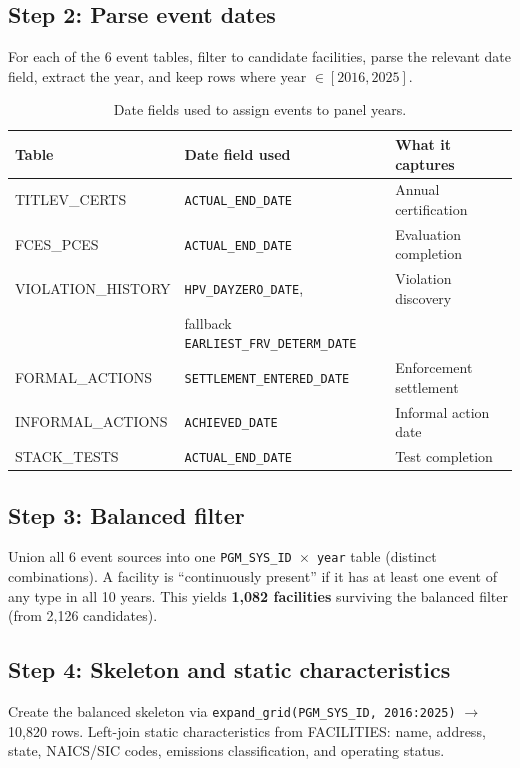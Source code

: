 \documentclass[11pt]{article}
\begin{document}
\subsection{Step 2: Parse event dates}

For each of the 6 event tables, filter to candidate facilities, parse the relevant date field, extract the year, and keep rows where year $\in [2016, 2025]$.

\begin{table}[H]
\centering
\begin{tabular}{lll}
\toprule
Table & Date field used & What it captures \\
\midrule
TITLEV\_CERTS & \texttt{ACTUAL\_END\_DATE} & Annual certification \\
FCES\_PCES & \texttt{ACTUAL\_END\_DATE} & Evaluation completion \\
VIOLATION\_HISTORY & \texttt{HPV\_DAYZERO\_DATE}, & Violation discovery \\
 & fallback \texttt{EARLIEST\_FRV\_DETERM\_DATE} & \\
FORMAL\_ACTIONS & \texttt{SETTLEMENT\_ENTERED\_DATE} & Enforcement settlement \\
INFORMAL\_ACTIONS & \texttt{ACHIEVED\_DATE} & Informal action date \\
STACK\_TESTS & \texttt{ACTUAL\_END\_DATE} & Test completion \\
\bottomrule
\end{tabular}
\caption{Date fields used to assign events to panel years.}
\end{table}

\subsection{Step 3: Balanced filter}

Union all 6 event sources into one \texttt{PGM\_SYS\_ID $\times$ year} table (distinct combinations). A facility is ``continuously present'' if it has at least one event of any type in all 10 years. This yields \textbf{1,082 facilities} surviving the balanced filter (from 2,126 candidates).

\subsection{Step 4: Skeleton and static characteristics}

Create the balanced skeleton via \texttt{expand\_grid(PGM\_SYS\_ID, 2016:2025)} $\rightarrow$ 10,820 rows. Left-join static characteristics from FACILITIES: name, address, state, NAICS/SIC codes, emissions classification, and operating status.
\end{document}
